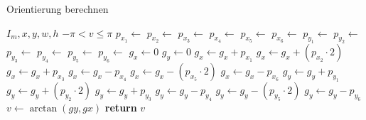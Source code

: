 \begin{algorithm}[ht]
\caption{Orientierung berechnen}
\label{alg:sobel}
\begin{algorithmic}[1]
	\Require $I_m, x, y, w, h$
	\Ensure $-\pi < v \leq \pi$
	\State $p_{x_1} \gets$ 
	\State $p_{x_2} \gets$ 
	\State $p_{x_3} \gets$ 
	\State $p_{x_4} \gets$ 
	\State $p_{x_5} \gets$ 
	\State $p_{x_6} \gets$ 
	\State $p_{y_1} \gets$ 
	\State $p_{y_2} \gets$ 
	\State $p_{y_3} \gets$ 
	\State $p_{y_4} \gets$ 
	\State $p_{y_5} \gets$ 
	\State $p_{y_6} \gets$ 
	\State $g_x \gets 0$
	\State $g_y \gets 0$
	\State $g_x \gets g_x + p_{x_1}$
	\State $g_x \gets g_x + \left(p_{x_2} \cdot 2\right)$
	\State $g_x \gets g_x + p_{x_3}$
	\State $g_x \gets g_x - p_{x_4}$
	\State $g_x \gets g_x - \left(p_{x_5} \cdot 2\right)$
	\State $g_x \gets g_x - p_{x_6}$
	\State $g_y \gets g_y + p_{y_1}$
	\State $g_y \gets g_y + \left(p_{y_2} \cdot 2\right)$
	\State $g_y \gets g_y + p_{y_3}$
	\State $g_y \gets g_y - p_{y_4}$
	\State $g_y \gets g_y - \left(p_{y_5} \cdot 2\right)$
	\State $g_y \gets g_y - p_{y_6}$
	\State $v \gets \arctan{\left(gy, gx\right)}$
	\State \textbf{return} $v$
\end{algorithmic}
\end{algorithm}
